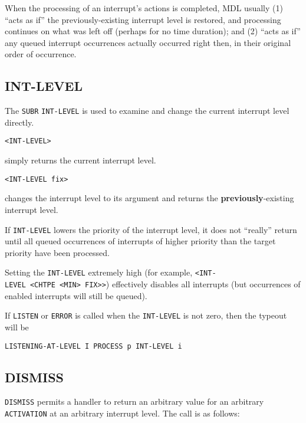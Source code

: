 \documentclass[a4paper]{scrbook}
\begin{document}
When the processing of an interrupt's actions is completed, MDL usually (1) ``acts as if'' the previously-existing
interrupt level is restored, and processing continues on what was left off (perhaps for no time duration); and (2) ``acts
as if'' any queued interrupt occurrences actually occurred right then, in their original order of occurrence.

\subsection{INT-LEVEL}\label{int-level}

The \texttt{SUBR} \texttt{INT-LEVEL} is used to examine and change the current interrupt
level directly.

\begin{verbatim}
<INT-LEVEL>
\end{verbatim}

simply returns the current interrupt level.

\begin{verbatim}
<INT-LEVEL fix>
\end{verbatim}

changes the interrupt level to its argument and returns the \textbf{previously}-existing interrupt level.

If \texttt{INT-LEVEL} lowers the priority of the interrupt level, it does not ``really'' return until all queued
occurrences of interrupts of higher priority than the target priority have been processed.

Setting the \texttt{INT-LEVEL} extremely high (for example,
\texttt{\textless{}INT-LEVEL\ \textless{}CHTPE\ \textless{}MIN\textgreater{}\ FIX\textgreater{}\textgreater{}}) effectively
disables all interrupts (but occurrences of enabled interrupts will still be queued).

If \texttt{LISTEN} or \texttt{ERROR} is called when the \texttt{INT-LEVEL} is
not zero, then the typeout will be

\begin{verbatim}
LISTENING-AT-LEVEL I PROCESS p INT-LEVEL i
\end{verbatim}

\subsection{DISMISS}\label{dismiss}

\texttt{DISMISS} permits a handler to return an arbitrary value for an arbitrary
\texttt{ACTIVATION}  at an arbitrary interrupt level. The call is as follows:
\end{document}
